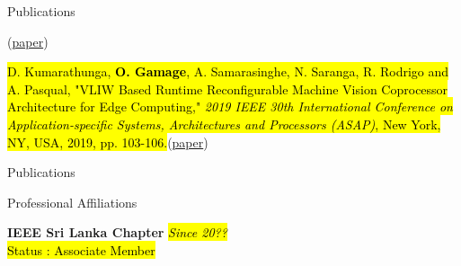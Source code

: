 \documentclass[
	11pt, %
]{./assets/resume} %
\begin{document}

\begin{rSection}{Publications}

	(\href{https://ieeexplore.ieee.org/document/9605975}{paper})

	\hl{D. Kumarathunga, \textbf{O. Gamage}, A. Samarasinghe, N. Saranga, R. Rodrigo and A. Pasqual, "VLIW Based Runtime Reconfigurable Machine Vision Coprocessor Architecture for Edge Computing," \textit{2019 IEEE 30th International Conference on Application-specific Systems, Architectures and Processors (ASAP)}, New York, NY, USA, 2019, pp. 103-106.}(\href{https://drive.google.com/open?id=166rtUrbnGk3XiRPDkxgzT3OWLazJaMRN}{paper})

\end{rSection}

\begin{rSection}{Publications}


	
	\end{rSection}


\begin{rSection}{Professional Affiliations}

	\textbf{IEEE Sri Lanka Chapter} \hfill \hl{\textit{Since 20??}} \\ 
	\hl{Status : Associate Member}

\end{rSection}

\end{document}
